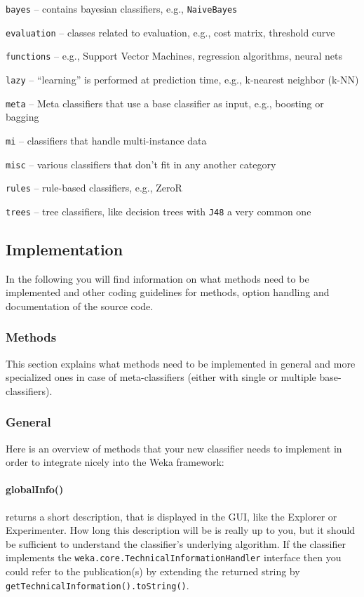 \begin{tight_itemize}
  \item \texttt{bayes} -- contains bayesian classifiers, e.g.,
\texttt{NaiveBayes}
  \item \texttt{evaluation} -- classes related to evaluation, e.g., cost
matrix, threshold curve
  \item \texttt{functions} -- e.g., Support Vector Machines, regression
algorithms, neural nets
  \item \texttt{lazy} -- ``learning'' is performed at prediction time, e.g.,
k-nearest neighbor (k-NN)
  \item \texttt{meta} -- Meta classifiers that use a base classifier as input,
e.g., boosting or bagging
  \item \texttt{mi} -- classifiers that handle multi-instance data
  \item \texttt{misc} -- various classifiers that don't fit in any another
category
  \item \texttt{rules} -- rule-based classifiers, e.g., ZeroR
  \item \texttt{trees} -- tree classifiers, like decision trees with
\texttt{J48} a very common one
\end{tight_itemize}

\newpage

\subsection{Implementation}
In the following you will find information on what methods need to be
implemented and other coding guidelines for methods, option handling and
documentation of the source code.

\subsubsection{Methods}
This section explains what methods need to be implemented in general and more
specialized ones in case of meta-classifiers (either with single or multiple
base-classifiers).

\subsubsection*{General}
Here is an overview of methods that your new classifier needs to implement in
order to integrate nicely into the Weka framework:

\paragraph{globalInfo()} returns a short description, that is displayed in the
GUI, like the Explorer or Experimenter. How long this description will be is
really up to you, but it should be sufficient to understand the classifier's
underlying algorithm. If the classifier implements the
\texttt{weka.core.TechnicalInformationHandler} interface then you could refer
to the publication(s) by extending the returned string by
\texttt{getTechnicalInformation().toString()}.

